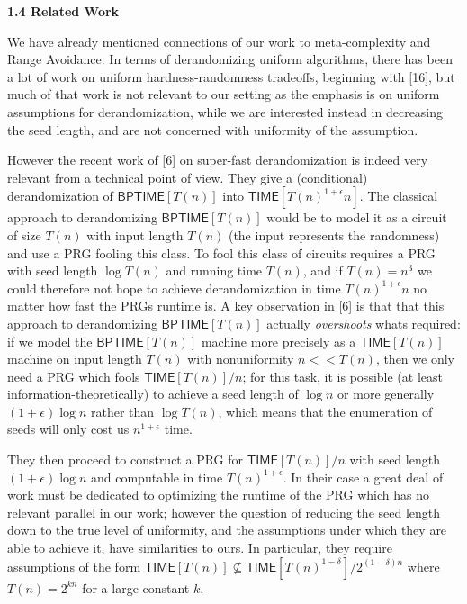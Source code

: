 \documentclass[10pt,a4paper]{article}
\begin{document}
\par\medskip\noindent\textbf{
1.4 Related Work}\par




We have already mentioned connections of our work to meta-complexity and Range Avoidance. In terms of derandomizing uniform algorithms, there has been a lot of work on uniform hardness-randomness tradeoffs, beginning with [16], but much of that work is not relevant to our setting as the emphasis is on uniform assumptions for derandomization, while we are interested instead in decreasing the seed length, and are not concerned with uniformity of the assumption.\par




However the recent work of [6] on super-fast derandomization is indeed very relevant from a technical point of view.
They give a (conditional) derandomization of ${\mathsf{BPTIME}}[T(n)]$ into ${\mathsf{TIME}}[T(n)^{1+\epsilon}n]$. The classical approach to derandomizing ${\mathsf{BPTIME}}[T(n)]$ would be to model it as a circuit of size $T(n)$ with input length $T(n)$ (the input represents the randomness) and use a PRG fooling this class. To fool this class of circuits requires a PRG with seed length $\log T(n)$ and running time $T(n)$, and if $T(n)=n^{3}$ we could therefore not hope to achieve derandomization in time $T(n)^{1+\epsilon}n$ no matter how fast the PRGs runtime is. A key observation in [6] is that that this approach to derandomizing ${\mathsf{BPTIME}}[T(n)]$ actually \emph{overshoots} whats required: if we model the ${\mathsf{BPTIME}}[T(n)]$ machine more precisely as a ${\mathsf{TIME}}[T(n)]$ machine on input length $T(n)$ with nonuniformity $n<<T(n)$, then we only need a PRG which fools ${\mathsf{TIME}}[T(n)]/n$; for this task, it is possible (at least information-theoretically) to achieve a seed length of $\log n$ or more generally $(1+\epsilon)\log n$ rather than $\log T(n)$, which means that the enumeration of seeds will only cost us $n^{1+\epsilon}$ time.\par




They then proceed to construct a PRG for ${\mathsf{TIME}}[T(n)]/n$ with seed length $(1+\epsilon)\log n$ and computable in time $T(n)^{1+\epsilon}$. In their case a great deal of work must be dedicated to optimizing the runtime of the PRG which has no relevant parallel in our work; however the question of reducing the seed length down to the true level of uniformity, and the assumptions under which they are able to achieve it, have similarities to ours. In particular, they require assumptions of the form ${\mathsf{TIME}}[T(n)]\not\subseteq{\mathsf{TIME}}[T(n)^{1-\delta}]/2^{(1-\delta)n}$ where $T(n)=2^{kn}$ for a large constant $k$.\par
\end{document}
